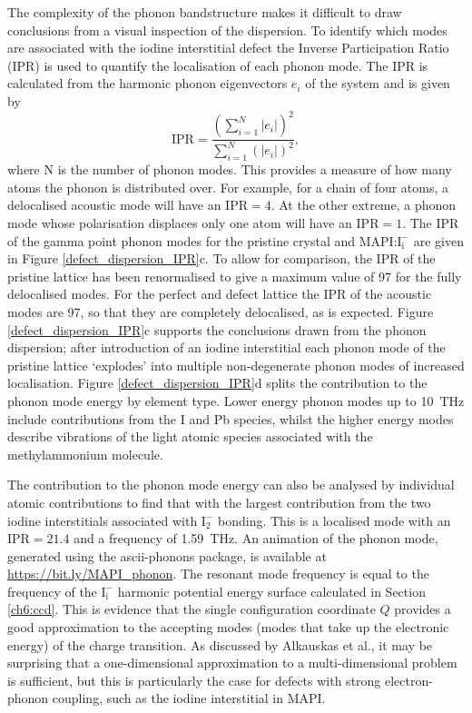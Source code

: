 The complexity of the phonon bandstructure makes it difficult to draw conclusions from a visual inspection of the dispersion.
To identify which modes are associated with the iodine interstitial defect the Inverse Participation Ratio (IPR) is used to quantify the localisation of each phonon mode. 
The IPR is calculated from the harmonic phonon eigenvectors $e_i$ of the system and is given by
\begin{equation}
\mathrm{IPR} = \frac{\left(\sum_{i=1}^N|e_i|\right)^2}{\sum_{i=1}^N\left(|e_i|\right)^2},
\end{equation}
where N is the number of phonon modes. This provides a measure of how many atoms the phonon is distributed over. For example, for a chain of four atoms, a delocalised acoustic mode will have an $\textrm{IPR}=4$. At the other extreme, a phonon mode whose polarisation displaces only one atom will have an $\textrm{IPR}=1$.
The IPR of the gamma point phonon modes for the pristine crystal and MAPI:$\mathrm{I}_\mathrm{i}^-$ are given in Figure \ref{defect_dispersion_IPR}c.
To allow for comparison, the IPR of the pristine lattice has been renormalised to give a maximum value of 97 for the fully delocalised modes.
For the perfect and defect lattice the IPR of the acoustic modes are 97, so that they are completely delocalised, as is expected.
Figure \ref{defect_dispersion_IPR}c supports the conclusions drawn from the phonon dispersion; after introduction of an iodine interstitial each phonon mode of the pristine lattice `explodes' into multiple non-degenerate phonon modes of increased localisation.
Figure \ref{defect_dispersion_IPR}d splits the contribution to the phonon mode energy by element type. 
Lower energy phonon modes up to \SI{10}{THz} include contributions from the I and Pb species, whilst the higher energy modes describe vibrations of the light atomic species associated with the methylammonium molecule.

The contribution to the phonon mode energy can also be analysed by individual atomic contributions to find that with the largest contribution from the two iodine interstitials associated with $\textrm{I}_2^-$ bonding. This is a localised mode with an $\textrm{IPR}=21.4$ and a frequency of \SI{1.59}{\tera\hertz}.
An animation of the phonon mode, generated using the ascii-phonons package,\autocite{asciiphonons} is available at \url{https://bit.ly/MAPI_phonon}.
The resonant mode frequency is equal to the frequency of the $\mathrm{I}_\mathrm{i}^-$ harmonic potential energy surface calculated in Section \ref{ch6:ccd}.
This is evidence that the single configuration coordinate $Q$ provides a good approximation to the accepting modes (modes that take up the electronic energy) of the charge transition.
As discussed by Alkauskas et al.,\autocite{Alkauskas2014} it may be surprising that a one-dimensional approximation to a multi-dimensional problem is sufficient, but this is particularly the case for defects with strong electron-phonon coupling, such as the iodine interstitial in MAPI.

